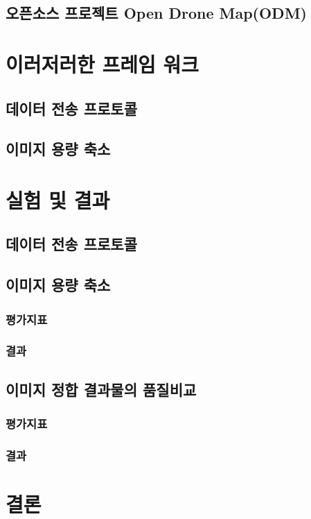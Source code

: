 \documentclass[master, korean]{pnuthesis}
\begin{document}
\section{오픈소스 프로젝트 Open Drone Map(ODM)}

\chapter{이러저러한 프레임 워크}

\section{데이터 전송 프로토콜}

\section{이미지 용량 축소}

\chapter{실험 및 결과}

\section{데이터 전송 프로토콜}


\section{이미지 용량 축소}
\subsection{평가지표}
\subsection{결과}


\section{이미지 정합 결과물의 품질비교}
\subsection{평가지표}
\subsection{결과}

\chapter{결론}
\end{document}
